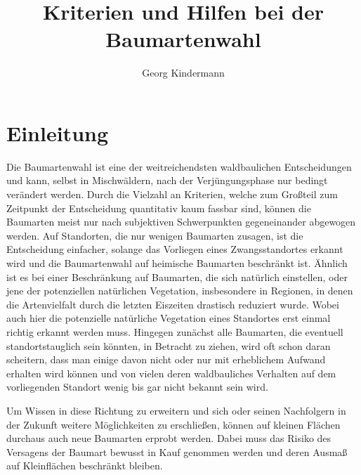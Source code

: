 \documentclass[twocolumn]{scrartcl}
\title{Kriterien und Hilfen bei der Baumartenwahl}
\author{Georg Kindermann}
\begin{document}

\tableofcontents

\section{Einleitung}

Die Baumartenwahl ist eine der weitreichendsten waldbaulichen
Entscheidungen und kann, selbst in Mischwäldern, nach der
Verjüngungsphase nur bedingt verändert werden. Durch die Vielzahl an
Kriterien, welche zum Großteil zum Zeitpunkt der Entscheidung
quantitativ kaum fassbar sind, können die Baumarten meist nur nach
subjektiven Schwerpunkten gegeneinander abgewogen werden. Auf
Standorten, die nur wenigen Baumarten zusagen, ist die Entscheidung
einfacher, solange das Vorliegen eines Zwangsstandortes erkannt wird
und die Baumartenwahl auf heimische Baumarten beschränkt ist. Ähnlich
ist es bei einer Beschränkung auf Baumarten, die sich natürlich
einstellen, oder jene der potenziellen natürlichen Vegetation,
insbesondere in Regionen, in denen die Artenvielfalt durch die letzten
Eiszeiten drastisch reduziert wurde. Wobei auch hier die potenzielle
natürliche Vegetation eines Standortes erst einmal richtig erkannt
werden muss. Hingegen zunächst alle Baumarten, die eventuell
standortstauglich sein könnten, in Betracht zu ziehen, wird oft schon
daran scheitern, dass man einige davon nicht oder nur mit erheblichem
Aufwand erhalten wird können und von vielen deren waldbauliches
Verhalten auf dem vorliegenden Standort wenig bis gar nicht bekannt
sein wird.

Um Wissen in diese Richtung zu erweitern und sich oder seinen Nachfolgern in
der Zukunft weitere Möglichkeiten zu erschließen, können auf kleinen Flächen
durchaus auch neue Baumarten erprobt werden. Dabei muss das Risiko des
Versagens der Baumart bewusst in Kauf genommen werden und deren Ausmaß auf
Kleinflächen beschränkt bleiben. 
\end{document}
